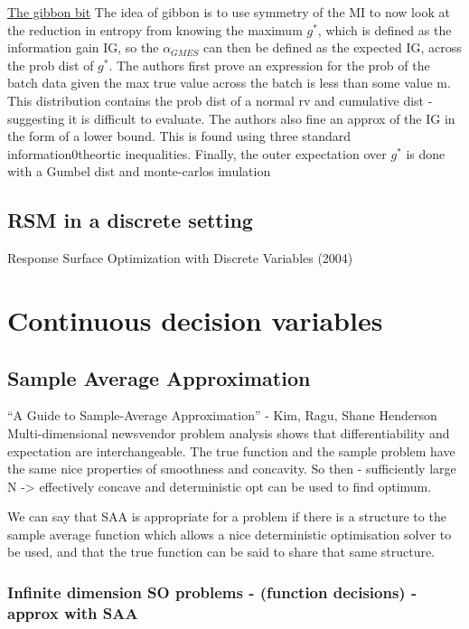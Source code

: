 \documentclass{article}
\begin{document}
  \underline{The gibbon bit}
    The idea of gibbon is to use symmetry of the MI to now look at the reduction in entropy from knowing the maximum $g^{*}$, which is defined as the information gain IG, so the $\alpha_{GMES}$ can then be defined as the expected IG, across the prob dist of $g^{*}$. The authors first prove an expression for the prob of the batch data given the max true value across the batch is less than some value m. This distribution contains the prob dist of a normal rv and cumulative dist - suggesting it is difficult to evaluate. The authors also fine an approx of the IG in the form of a lower bound. This is found using three standard information0theortic inequalities. Finally, the outer expectation over $g^{*}$ is done with a Gumbel dist and monte-carlos imulation 
  

\subsection{RSM in a discrete setting}

Response Surface Optimization with Discrete Variables (2004)

\section{Continuous decision variables}

\subsection{Sample Average Approximation}

``A Guide to Sample-Average Approximation'' - Kim, Ragu, Shane Henderson
Multi-dimensional newsvendor problem analysis shows that differentiability and expectation are interchangeable. The true function and the sample problem have the same nice properties of smoothness and concavity. So then - sufficiently large N -> effectively concave and deterministic opt can be used to find optimum.

We can say that SAA is appropriate for a problem if there is a structure to the sample average function which allows a nice deterministic optimisation solver to be used, and that the true function can be said to share that same structure.

\subsubsection{Infinite dimension SO problems - (function decisions) - approx with SAA}
\end{document}
